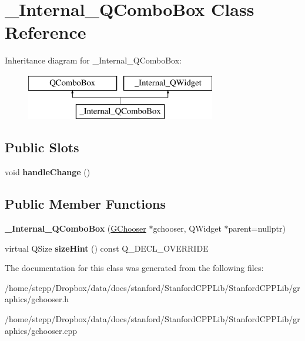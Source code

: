 \hypertarget{class__Internal__QComboBox}{}\section{\+\_\+\+Internal\+\_\+\+Q\+Combo\+Box Class Reference}
\label{class__Internal__QComboBox}
Inheritance diagram for \+\_\+\+Internal\+\_\+\+Q\+Combo\+Box\+:\begin{figure}[H]
\begin{center}
\leavevmode
\includegraphics[height=2.000000cm]{class__Internal__QComboBox}
\end{center}
\end{figure}
\subsection*{Public Slots}
\begin{DoxyCompactItemize}
\item 
\mbox{\label{class__Internal__QComboBox_a527aad0b75d08511a030d2312d122978}} 
void {\bfseries handle\+Change} ()
\end{DoxyCompactItemize}
\subsection*{Public Member Functions}
\begin{DoxyCompactItemize}
\item 
\mbox{\label{class__Internal__QComboBox_adfb3a86d5f8e3baaf25bd6dce5373875}} 
{\bfseries \+\_\+\+Internal\+\_\+\+Q\+Combo\+Box} (\mbox{\hyperlink{classGChooser}{G\+Chooser}} $\ast$gchooser, Q\+Widget $\ast$parent=nullptr)
\item 
\mbox{\label{class__Internal__QComboBox_ad0b1ef7096acb90a132670efc08916be}} 
virtual Q\+Size {\bfseries size\+Hint} () const Q\+\_\+\+D\+E\+C\+L\+\_\+\+O\+V\+E\+R\+R\+I\+DE
\end{DoxyCompactItemize}


The documentation for this class was generated from the following files\+:\begin{DoxyCompactItemize}
\item 
/home/stepp/\+Dropbox/data/docs/stanford/\+Stanford\+C\+P\+P\+Lib/\+Stanford\+C\+P\+P\+Lib/graphics/gchooser.\+h\item 
/home/stepp/\+Dropbox/data/docs/stanford/\+Stanford\+C\+P\+P\+Lib/\+Stanford\+C\+P\+P\+Lib/graphics/gchooser.\+cpp\end{DoxyCompactItemize}

